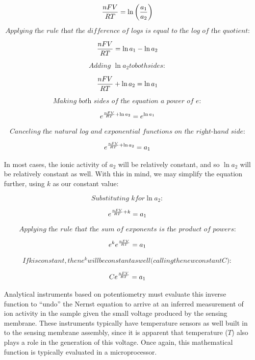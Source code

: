 $${nFV \over RT} = \ln \left({a_1 \over a_2}\right)$$

\filbreak

$$\textit{Applying the rule that the difference of logs is equal to the log of the quotient:}$$

$${nFV \over RT} = \ln a_1 - \ln a_2$$

$$\textit{Adding } \ln a_2 { to both sides:}$$

$${nFV \over RT} + \ln a_2 = \ln a_1$$

$$\textit{Making both sides of the equation a power of } e {:}$$

$$e^{{nFV \over RT} + \ln a_2} = e^{\ln a_1}$$

$$\textit{Canceling the natural log and exponential functions on the right-hand side:}$$

$$e^{{nFV \over RT} + \ln a_2} = a_1$$

In most cases, the ionic activity of $a_2$ will be relatively constant, and so $\ln a_2$ will be relatively constant as well.  With this in mind, we may simplify the equation further, using $k$ as our constant value:

$$\textit{Substituting } k { for } \ln a_2 {:}$$

$$e^{{nFV \over RT} + k} = a_1$$

$$\textit{Applying the rule that the sum of exponents is the product of powers:}$$

$$e^k e^{nFV \over RT} = a_1$$

$${If } k { is constant, then } e^k { will be constant as well (calling the new constant } C {):}$$

$$C e^{nFV \over RT} = a_1$$

Analytical instruments based on potentiometry must evaluate this inverse function to ``undo'' the Nernst equation to arrive at an inferred measurement of ion activity in the sample given the small voltage produced by the sensing membrane.  These instruments typically have temperature sensors as well built in to the sensing membrane assembly, since it is apparent that temperature ($T$) also plays a role in the generation of this voltage.  Once again, this mathematical function is typically evaluated in a microprocessor.









